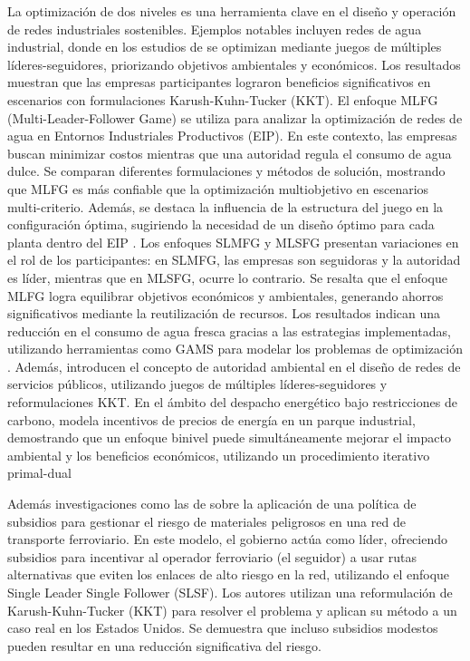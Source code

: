 La optimización de dos niveles es una herramienta clave en el diseño y operación de redes industriales sostenibles. Ejemplos notables incluyen redes de agua industrial, 
donde en los estudios de \cite{Ramos2016WaterII} se optimizan mediante juegos de múltiples líderes-seguidores, priorizando objetivos ambientales y económicos. Los resultados muestran que las empresas participantes lograron beneficios significativos en escenarios con formulaciones Karush-Kuhn-Tucker (KKT). 
El enfoque MLFG (Multi-Leader-Follower Game) se utiliza para analizar la optimización de redes de agua en Entornos Industriales Productivos (EIP). En este contexto, las empresas buscan minimizar costos mientras que una autoridad regula el consumo de agua dulce. Se comparan diferentes formulaciones y métodos de solución, mostrando que MLFG es más confiable que la optimización multiobjetivo en escenarios multi-criterio. Además, se destaca la influencia de la estructura del juego en la configuración óptima, sugiriendo la necesidad de un diseño óptimo para cada planta dentro del EIP \cite{Ramos2016WaterII}. 
Los enfoques SLMFG y MLSFG presentan variaciones en el rol de los participantes: en SLMFG, las empresas son seguidoras y la autoridad es líder, mientras que en MLSFG, ocurre lo contrario. Se resalta que el enfoque MLFG logra equilibrar objetivos económicos y ambientales, generando ahorros significativos mediante la reutilización de recursos. Los resultados indican una reducción en el consumo de agua fresca gracias a las estrategias implementadas, utilizando herramientas como GAMS para modelar los problemas de optimización \cite{Ramos2016WaterII}. 
Además, \cite{Ramos2018UtilityNO} introducen el concepto de autoridad ambiental en el diseño de redes de servicios públicos, utilizando juegos de múltiples líderes-seguidores y reformulaciones KKT. 
En el ámbito del despacho energético bajo restricciones de carbono, \cite{Gu2020BilevelOL} modela incentivos de precios de energía en un parque industrial, demostrando que un enfoque binivel puede simultáneamente mejorar el impacto ambiental y los beneficios económicos, utilizando un procedimiento iterativo primal-dual

Además investigaciones como las de \cite{Bhavsar2021ASP} sobre la aplicación de una política de subsidios para gestionar el riesgo de materiales peligrosos en una red de transporte ferroviario. En este modelo, el gobierno actúa como líder, ofreciendo subsidios para incentivar al operador ferroviario (el seguidor) a usar rutas alternativas que eviten los enlaces de alto riesgo en la red, utilizando el enfoque Single Leader Single Follower (SLSF). Los autores utilizan una reformulación de Karush-Kuhn-Tucker (KKT) para resolver el problema y aplican su método a un caso real en los Estados Unidos. Se demuestra que incluso subsidios modestos pueden resultar en una reducción significativa del riesgo.



